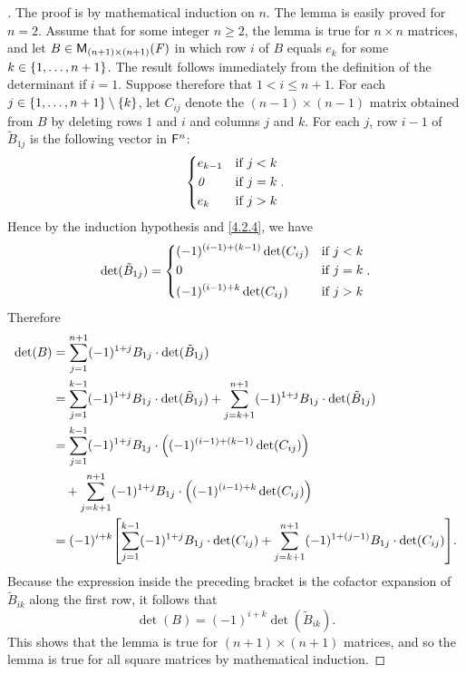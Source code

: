 \begin{proof}[]
  The proof is by mathematical induction on \(n\).
  The lemma is easily proved for \(n = 2\).
  Assume that for some integer \(n \geq 2\), the lemma is true for \(n \times n\) matrices, and let \(B \in \mathsf{M}_{{(n + 1)} \times (n + 1)}({\mathit{F}})\) in which row \(i\) of \(B\) equals \(e_k\) for some \(k \in \left\lbrace1, \dots, n + 1\right\rbrace\).
  The result follows immediately from the definition of the determinant if \(i = 1\).
  Suppose therefore that \(1 < i \leq n + 1\).
  For each \(j \in \left\lbrace1, \dots, n + 1\right\rbrace \setminus \left\lbrace k\right\rbrace\), let \(C_{i j}\) denote the \((n - 1) \times (n - 1)\) matrix obtained from \(B\) by deleting rows \(1\) and \(i\) and columns \(j\) and \(k\).
  For each \(j\), row \(i - 1\) of \(\tilde{B}_{1 j}\) is the following vector in \(\mathsf{F}^n\):
  \[
    \begin{dcases}
      e_{k - 1} & \text{if } j < k \\
      \mathit{0}       & \text{if } j = k \\
      e_k       & \text{if } j > k
    \end{dcases}.
  \]
  Hence by the induction hypothesis and \cref{4.2.4}, we have
  \[
    \det(\tilde{B}_{1 j}) = \begin{dcases}
      (-1)^{(i - 1) + (k - 1)} \det(C_{i j}) & \text{if } j < k \\
      0                                      & \text{if } j = k \\
      (-1)^{(i - 1) + k} \det(C_{i j})       & \text{if } j > k
    \end{dcases}.
  \]
  Therefore
  \begin{align*}
    \det(B) & = \sum_{j = 1}^{n + 1} (-1)^{1 + j} B_{1 j} \cdot \det(\tilde{B}_{1 j})                                                                                      \\
            & = \sum_{j = 1}^{k - 1} (-1)^{1 + j} B_{1 j} \cdot \det(\tilde{B}_{1 j}) + \sum_{j = k + 1}^{n + 1} (-1)^{1 + j} B_{1 j} \cdot \det(\tilde{B}_{1 j})          \\
            & = \sum_{j = 1}^{k - 1} (-1)^{1 + j} B_{1 j} \cdot \pa{(-1)^{(i - 1) + (k - 1)} \det(C_{i j})}                                                                \\
            & \quad + \sum_{j = k + 1}^{n + 1} (-1)^{1 + j} B_{1 j} \cdot \pa{(-1)^{(i - 1) + k} \det(C_{i j})}                                                            \\
            & = (-1)^{i + k} \br{\sum_{j = 1}^{k - 1} (-1)^{1 + j} B_{1 j} \cdot \det(C_{i j}) + \sum_{j = k + 1}^{n + 1} (-1)^{1 + (j - 1)} B_{1 j} \cdot \det(C_{i j})}.
  \end{align*}
  Because the expression inside the preceding bracket is the cofactor expansion of \(\tilde{B}_{i k}\) along the first row, it follows that
  \[
    \det(B) = (-1)^{i + k} \det(\tilde{B}_{i k}).
  \]
  This shows that the lemma is true for \((n + 1) \times (n + 1)\) matrices, and so the lemma is true for all square matrices by mathematical induction.
\end{proof}

